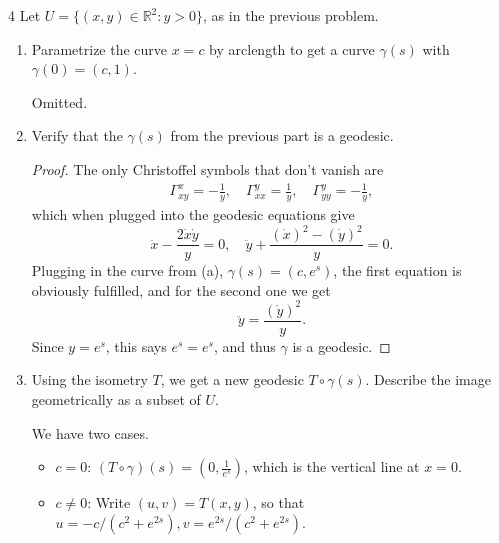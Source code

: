 \documentclass[11pt]{article}
\begin{document}
\begin{problem}{4}
  Let \( U = \{(x,y) \in \mathbb{R}^2 : y > 0\} \), as in the previous problem.
  \begin{enumerate}[label=(\alph*)]
    \item Parametrize the curve \( x = c \) by arclength to get a curve \(\gamma(s)\) with \(\gamma(0) = (c,1)\).
          \begin{answer}
            Omitted.
          \end{answer}
    \item Verify that the \(\gamma(s)\) from the previous part is a geodesic.
          \begin{proof}
            The only Christoffel symbols that don't vanish are
            \begin{equation}
            \label{eq:2}
            \begin{aligned}
              \Gamma_{xy}^x = - \frac{1}{y}, \quad \Gamma_{xx}^y = \frac{1}{y}, \quad \Gamma_{yy}^y = - \frac{1}{y},
            \end{aligned}
          \end{equation}
          which when plugged into the geodesic equations give
          \begin{equation}
          \label{eq:3}
          \ddot{x} - \frac{2 \dot{x} \dot{y}}{y} = 0, \quad \ddot{y} + \frac{(\dot{x})^2 - (\dot{y})^2}{y} = 0.
        \end{equation}
        Plugging in the curve from (a), \( \gamma(s) = (c, e^s) \), the first equation is obviously fulfilled, and for the second one we get
        \begin{equation}
        \label{eq:4}
        \ddot{y} = \frac{(\dot{y})^2}{y}.
      \end{equation}
      Since \( y = e^s \), this says \( e^s = e^s \), and thus \(\gamma\) is a geodesic.
          \end{proof}
    \item Using the isometry \( T \), we get a new geodesic \( T \circ \gamma(s) \).
          Describe the image geometrically as a subset of \( U \).
          \begin{answer}
            We have two cases.
            \begin{itemize}
              \item \( c = 0 \): \( (T \circ \gamma)(s) = (0, \frac{1}{e^s}) \), which is the vertical line at \( x = 0 \).
              \item \( c \neq 0 \): Write \( (u,v) = T(x,y) \), so that \( u = -c/(c^2 + e^{2s}), v = e^{2s}/(c^2 + e^{2s}) \).

\end{itemize}
\end{answer}
\end{enumerate}
\end{problem}
\end{document}
